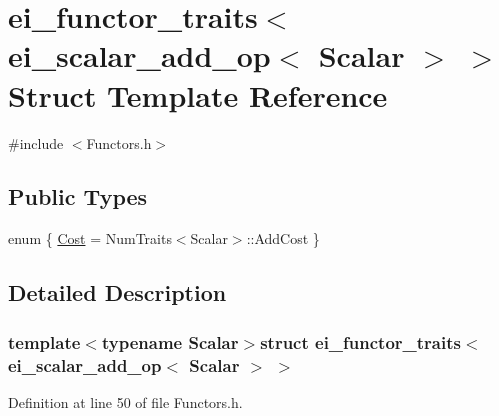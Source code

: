 \hypertarget{structei__functor__traits_3_01ei__scalar__add__op_3_01_scalar_01_4_01_4}{\section{ei\-\_\-functor\-\_\-traits$<$ ei\-\_\-scalar\-\_\-add\-\_\-op$<$ Scalar $>$ $>$ Struct Template Reference}
\label{structei__functor__traits_3_01ei__scalar__add__op_3_01_scalar_01_4_01_4}
}


{\ttfamily \#include $<$Functors.\-h$>$}

\subsection*{Public Types}
\begin{DoxyCompactItemize}
\item 
enum \{ \hyperlink{structei__functor__traits_3_01ei__scalar__add__op_3_01_scalar_01_4_01_4_a6e1bbefe336a3a97438f82b46bbf5685a168936a8b6074e1d0a62903fe4eb540b}{Cost} = Num\-Traits$<$Scalar$>$\-:\-:Add\-Cost
 \}
\end{DoxyCompactItemize}


\subsection{Detailed Description}
\subsubsection*{template$<$typename Scalar$>$struct ei\-\_\-functor\-\_\-traits$<$ ei\-\_\-scalar\-\_\-add\-\_\-op$<$ Scalar $>$ $>$}



Definition at line 50 of file Functors.\-h.



